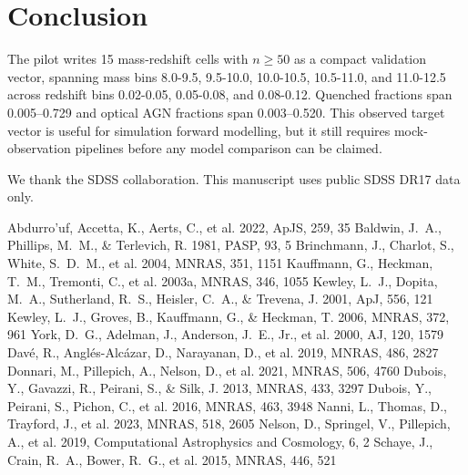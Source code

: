 \documentclass[twocolumn]{aastex631}
\begin{document}
\section{Conclusion}\label{sec:conclusion}
The pilot writes 15 mass-redshift cells with $n \geq 50$ as a compact validation vector, spanning mass bins 8.0-9.5, 9.5-10.0, 10.0-10.5, 10.5-11.0, and 11.0-12.5 across redshift bins 0.02-0.05, 0.05-0.08, and 0.08-0.12. Quenched fractions span 0.005--0.729 and optical AGN fractions span 0.003--0.520. This observed target vector is useful for simulation forward modelling, but it still requires mock-observation pipelines before any model comparison can be claimed.

\acknowledgments
We thank the SDSS collaboration. This manuscript uses public SDSS DR17 data only.


\begin{thebibliography}{}
 Abdurro'uf, Accetta, K., Aerts, C., et al. 2022, ApJS, 259, 35
 Baldwin, J.~A., Phillips, M.~M., \& Terlevich, R. 1981, PASP, 93, 5
 Brinchmann, J., Charlot, S., White, S.~D.~M., et al. 2004, MNRAS, 351, 1151
 Kauffmann, G., Heckman, T.~M., Tremonti, C., et al. 2003a, MNRAS, 346, 1055
 Kewley, L.~J., Dopita, M.~A., Sutherland, R.~S., Heisler, C.~A., \& Trevena, J. 2001, ApJ, 556, 121
 Kewley, L.~J., Groves, B., Kauffmann, G., \& Heckman, T. 2006, MNRAS, 372, 961
 York, D.~G., Adelman, J., Anderson, J.~E., Jr., et al. 2000, AJ, 120, 1579
 Dav\'e, R., Angl\'es-Alc\'azar, D., Narayanan, D., et al. 2019, MNRAS, 486, 2827
 Donnari, M., Pillepich, A., Nelson, D., et al. 2021, MNRAS, 506, 4760
 Dubois, Y., Gavazzi, R., Peirani, S., \& Silk, J. 2013, MNRAS, 433, 3297
 Dubois, Y., Peirani, S., Pichon, C., et al. 2016, MNRAS, 463, 3948
 Nanni, L., Thomas, D., Trayford, J., et al. 2023, MNRAS, 518, 2605
 Nelson, D., Springel, V., Pillepich, A., et al. 2019, Computational Astrophysics and Cosmology, 6, 2
 Schaye, J., Crain, R.~A., Bower, R.~G., et al. 2015, MNRAS, 446, 521
\end{thebibliography}
\end{document}
